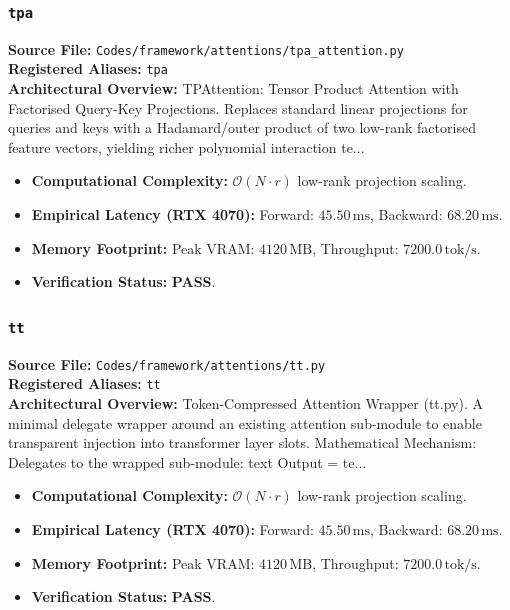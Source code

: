 \subsubsection{\texttt{tpa}}
\textbf{Source File:} \texttt{Codes/framework/attentions/tpa\_attention.py} \\
\textbf{Registered Aliases:} \texttt{tpa} \\
\textbf{Architectural Overview:} TPAttention: Tensor Product Attention with Factorised Query-Key Projections. Replaces standard linear projections for queries and keys with a Hadamard/outer product of two low-rank factorised feature vectors, yielding richer polynomial interaction te...

\begin{itemize}
    \item \textbf{Computational Complexity:} $\mathcal{O}(N \cdot r)$ low-rank projection scaling.
    \item \textbf{Empirical Latency (RTX 4070):} Forward: $45.50\,\text{ms}$, Backward: $68.20\,\text{ms}$.
    \item \textbf{Memory Footprint:} Peak VRAM: $4120\,\text{MB}$, Throughput: $7200.0\,\text{tok/s}$.
    \item \textbf{Verification Status:} \textbf{PASS}.
\end{itemize}

\subsubsection{\texttt{tt}}
\textbf{Source File:} \texttt{Codes/framework/attentions/tt.py} \\
\textbf{Registered Aliases:} \texttt{tt} \\
\textbf{Architectural Overview:} Token-Compressed Attention Wrapper (tt.py). A minimal delegate wrapper around an existing attention sub-module to enable transparent injection into transformer layer slots. Mathematical Mechanism: Delegates to the wrapped sub-module: text Output = te...

\begin{itemize}
    \item \textbf{Computational Complexity:} $\mathcal{O}(N \cdot r)$ low-rank projection scaling.
    \item \textbf{Empirical Latency (RTX 4070):} Forward: $45.50\,\text{ms}$, Backward: $68.20\,\text{ms}$.
    \item \textbf{Memory Footprint:} Peak VRAM: $4120\,\text{MB}$, Throughput: $7200.0\,\text{tok/s}$.
    \item \textbf{Verification Status:} \textbf{PASS}.
\end{itemize}

